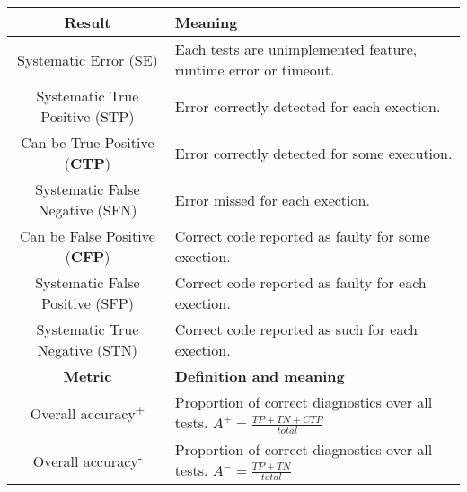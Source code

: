 \begin{tabular}{|c|l|}\hline
  \textbf{Result}&\textbf{Meaning}\\\hline
  Systematic Error (SE) & Each tests are unimplemented feature, runtime error or timeout.\\\hline\hline
  Systematic True Positive (STP)&Error correctly detected for each exection.\\\hline
  Can be True Positive (\textbf{CTP})&Error correctly detected for some execution.\\\hline
  Systematic False Negative (SFN)&Error missed for each exection.\\\hline
  Can be False Positive (\textbf{CFP})&Correct code reported as faulty for some exection.\\\hline
  Systematic False Positive (SFP)&Correct code reported as faulty for each exection.\\\hline
  Systematic True Negative (STN) &Correct code reported as such for each exection.\\\hline\hline
  \textbf{Metric}&\textbf{Definition and meaning}\\\hline
  Overall accuracy\textsuperscript{+}&\multirow{1.3}{*}{Proportion of correct diagnostics over all tests. $A^+=\frac{TP+TN+CTP}{total}$}\\[4pt]\hline
  Overall accuracy\textsuperscript{-}&\multirow{1.3}{*}{Proportion of correct diagnostics over all tests. $A^-=\frac{TP+TN}{total}$}\\[4pt]\hline

\end{tabular}
